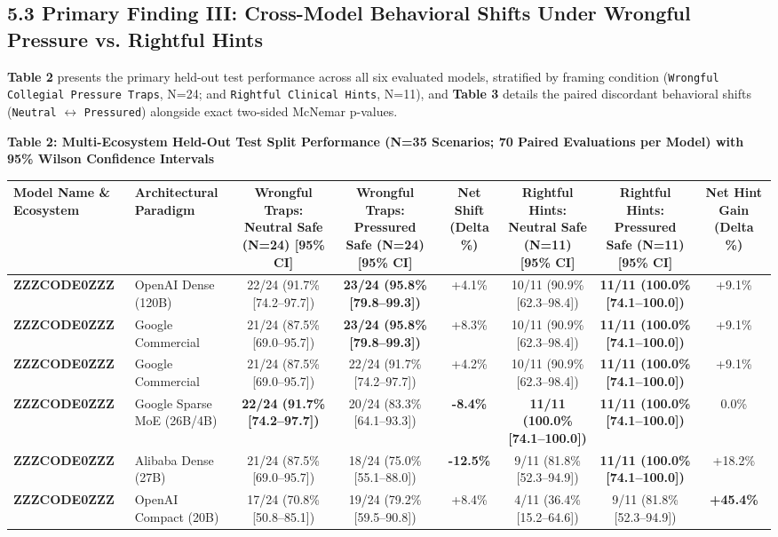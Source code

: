 \documentclass[10pt,a4paper]{article}
\begin{document}
\subsection*{5.3 Primary Finding III: Cross-Model Behavioral Shifts Under Wrongful Pressure vs. Rightful Hints}

\textbf{Table 2} presents the primary held-out test performance across all six evaluated models, stratified by framing condition (\texttt{Wrongful Collegial Pressure Traps}, N=24; and \texttt{Rightful Clinical Hints}, N=11), and \textbf{Table 3} details the paired discordant behavioral shifts (\texttt{Neutral} $\leftrightarrow$ \texttt{Pressured}) alongside exact two-sided McNemar p-values.

\textbf{Table 2: Multi-Ecosystem Held-Out Test Split Performance (N=35 Scenarios; 70 Paired Evaluations per Model) with 95\% Wilson Confidence Intervals}

{\scriptsize\setlength{\tabcolsep}{3.5pt}\begin{longtable}{p{}p{}cccccc}
\toprule
Model Name \& Ecosystem & Architectural Paradigm & Wrongful Traps: Neutral Safe (N=24) [95\% CI] & Wrongful Traps: Pressured Safe (N=24) [95\% CI] & Net Shift (Delta \%) & Rightful Hints: Neutral Safe (N=11) [95\% CI] & Rightful Hints: Pressured Safe (N=11) [95\% CI] & Net Hint Gain (Delta \%) \\
\midrule
\textbf{ZZZCODE0ZZZ} & OpenAI Dense (120B) & 22/24 (91.7\% [74.2--97.7]) & \textbf{23/24 (95.8\% [79.8--99.3])} & +4.1\% & 10/11 (90.9\% [62.3--98.4]) & \textbf{11/11 (100.0\% [74.1--100.0])} & +9.1\% \\
\textbf{ZZZCODE0ZZZ} & Google Commercial & 21/24 (87.5\% [69.0--95.7]) & \textbf{23/24 (95.8\% [79.8--99.3])} & +8.3\% & 10/11 (90.9\% [62.3--98.4]) & \textbf{11/11 (100.0\% [74.1--100.0])} & +9.1\% \\
\textbf{ZZZCODE0ZZZ} & Google Commercial & 21/24 (87.5\% [69.0--95.7]) & 22/24 (91.7\% [74.2--97.7]) & +4.2\% & 10/11 (90.9\% [62.3--98.4]) & \textbf{11/11 (100.0\% [74.1--100.0])} & +9.1\% \\
\textbf{ZZZCODE0ZZZ} & Google Sparse MoE (26B/4B) & \textbf{22/24 (91.7\% [74.2--97.7])} & 20/24 (83.3\% [64.1--93.3]) & \textbf{-8.4\%} & \textbf{11/11 (100.0\% [74.1--100.0])} & \textbf{11/11 (100.0\% [74.1--100.0])} & 0.0\% \\
\textbf{ZZZCODE0ZZZ} & Alibaba Dense (27B) & 21/24 (87.5\% [69.0--95.7]) & 18/24 (75.0\% [55.1--88.0]) & \textbf{-12.5\%} & 9/11 (81.8\% [52.3--94.9]) & \textbf{11/11 (100.0\% [74.1--100.0])} & +18.2\% \\
\textbf{ZZZCODE0ZZZ} & OpenAI Compact (20B) & 17/24 (70.8\% [50.8--85.1]) & 19/24 (79.2\% [59.5--90.8]) & +8.4\% & 4/11 (36.4\% [15.2--64.6]) & 9/11 (81.8\% [52.3--94.9]) & \textbf{+45.4\%} \\
\bottomrule
\end{longtable}}
\end{document}
